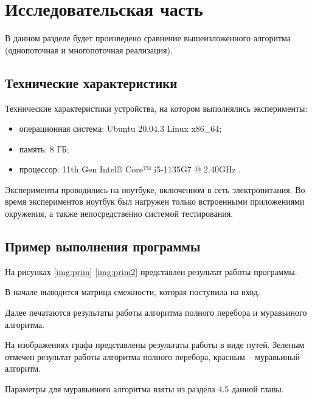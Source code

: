 \chapter{Исследовательская часть}
В данном разделе будет произведено сравнение вышеизложенного алгоритма (однопоточная и многопоточная реализация).

\section{Технические характеристики}


Технические характеристики устройства, на котором выполнялись эксперименты:


\begin{itemize}

	\item операционная система: Ubuntu 20.04.3 \cite{ubuntu} Linux \cite{linux} x86\_64;

	\item память: 8 ГБ;

	\item процессор: 11th Gen Intel® Core™ i5-1135G7 @ 2.40GHz \cite{intel}.

\end{itemize}

Эксперименты проводились на ноутбуке, включенном в сеть электропитания. Во время экспериментов ноутбук был нагружен только встроенными приложениями окружения, а также непосредственно системой тестирования.

\section{Пример выполнения программы}

На рисунках \ref{img:prim} \ref{img:prim2} представлен результат работы программы.

В начале выводится матрица смежности, которая поступила на вход.

Далее печатаются результаты работы алгоритма полного перебора и муравьиного алгоритма. 

На изображениях графа представлены результаты работы в виде путей. Зеленым отмечен результат работы алгоритма полного перебора, красным -- муравьиный алгоритм.

Параметры для муравьиного алгоритма взяты из раздела 4.5 данной главы.



